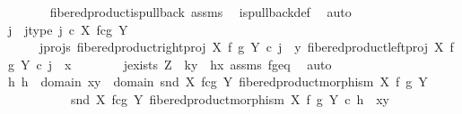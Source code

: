 \begin{isabellebody}
\ \ \ \ \ \ \isamarkupfalse%
\ fibered{\isacharunderscore}{\kern0pt}product{\isacharunderscore}{\kern0pt}is{\isacharunderscore}{\kern0pt}pullback\ assms\ \isamarkupfalse%
\ is{\isacharunderscore}{\kern0pt}pullback{\isacharunderscore}{\kern0pt}def\ \isamarkupfalse%
\ auto\isanewline
\isanewline
\ \ \ \ \isamarkupfalse%
\ j\ \ j{\isacharunderscore}{\kern0pt}type{\isacharcolon}{\kern0pt}\ {\isachardoublequoteopen}j\ {\isasymin}\isactrlsub c\ X\ \isactrlbsub f\isactrlesub {\isasymtimes}\isactrlsub c\isactrlbsub g\isactrlesub \ Y{\isachardoublequoteclose}\ \ \isanewline
\ \ \ \ \ \ j{\isacharunderscore}{\kern0pt}projs{\isacharcolon}{\kern0pt}\ {\isachardoublequoteopen}fibered{\isacharunderscore}{\kern0pt}product{\isacharunderscore}{\kern0pt}right{\isacharunderscore}{\kern0pt}proj\ X\ f\ g\ Y\ {\isasymcirc}\isactrlsub c\ j\ {\isacharequal}{\kern0pt}\ y{\isachardoublequoteclose}\ {\isachardoublequoteopen}fibered{\isacharunderscore}{\kern0pt}product{\isacharunderscore}{\kern0pt}left{\isacharunderscore}{\kern0pt}proj\ X\ f\ g\ Y\ {\isasymcirc}\isactrlsub c\ j\ {\isacharequal}{\kern0pt}\ x{\isachardoublequoteclose}\isanewline
\ \ \ \ \ \ \isamarkupfalse%
\ j{\isacharunderscore}{\kern0pt}exists{\isacharbrackleft}{\kern0pt}\ Z{\isacharequal}{\kern0pt}{\isasymone}{\isacharcomma}{\kern0pt}\ \ k{\isacharequal}{\kern0pt}y{\isacharcomma}{\kern0pt}\ \ h{\isacharequal}{\kern0pt}x{\isacharbrackright}{\kern0pt}\ assms\ f{\isacharunderscore}{\kern0pt}g{\isacharunderscore}{\kern0pt}eq\ \isamarkupfalse%
\ auto\isanewline
\ \ \ \ \isamarkupfalse%
\ {\isachardoublequoteopen}{\isasymexists}h{\isachardot}{\kern0pt}\ h\ {\isacharcolon}{\kern0pt}\ domain\ {\isasymlangle}x{\isacharcomma}{\kern0pt}y{\isasymrangle}\ {\isasymrightarrow}\ domain\ {\isacharparenleft}{\kern0pt}snd\ {\isacharparenleft}{\kern0pt}X\ \isactrlbsub f\isactrlesub {\isasymtimes}\isactrlsub c\isactrlbsub g\isactrlesub \ Y{\isacharcomma}{\kern0pt}\ fibered{\isacharunderscore}{\kern0pt}product{\isacharunderscore}{\kern0pt}morphism\ X\ f\ g\ Y{\isacharparenright}{\kern0pt}{\isacharparenright}{\kern0pt}\ {\isasymand}\isanewline
\ \ \ \ \ \ \ \ \ \ \ snd\ {\isacharparenleft}{\kern0pt}X\ \isactrlbsub f\isactrlesub {\isasymtimes}\isactrlsub c\isactrlbsub g\isactrlesub \ Y{\isacharcomma}{\kern0pt}\ fibered{\isacharunderscore}{\kern0pt}product{\isacharunderscore}{\kern0pt}morphism\ X\ f\ g\ Y{\isacharparenright}{\kern0pt}\ {\isasymcirc}\isactrlsub c\ h\ {\isacharequal}{\kern0pt}\ {\isasymlangle}x{\isacharcomma}{\kern0pt}y{\isasymrangle}{\isachardoublequoteclose}\isanewline

\end{isabellebody}
